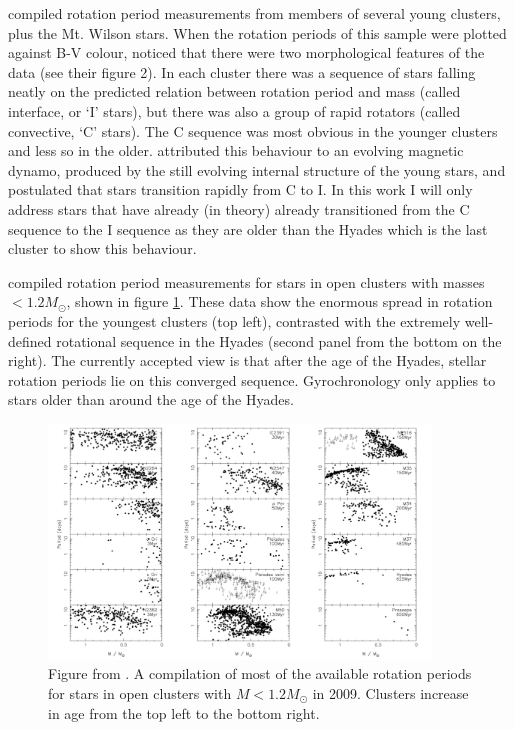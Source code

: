 \citet{Barnes2003} compiled rotation period measurements from members of
several young clusters, plus the Mt. Wilson stars.
When the rotation periods of this sample were plotted against B-V colour,
\citet{Barnes2003} noticed that there were two morphological features of the
data (see their figure 2).
In each cluster there was a sequence of stars falling neatly on the predicted
relation between rotation period and mass (called interface, or `I' stars),
but there was also a group of rapid rotators (called convective, `C' stars).
The C sequence was most obvious in the younger clusters and less so in the
older.
\citet{Barnes2003} attributed this behaviour to an evolving magnetic dynamo,
produced by the still evolving internal structure of the young stars, and
postulated that stars transition rapidly from C to I.
In this work I will only address stars that have already (in theory) already
transitioned from the C sequence to the I sequence as they are older than the
Hyades which is the last cluster to show this behaviour.

\citet{Irwin2009} compiled rotation period measurements for stars in open
clusters with masses $< 1.2 M_\odot$, shown in figure \ref{fig:irwin}.
These data show the enormous spread in rotation periods for the youngest
clusters (top left), contrasted with the extremely well-defined rotational
sequence in the Hyades (second panel from the bottom on the right).
The currently accepted view is that after the age of the Hyades, stellar
rotation periods lie on this converged sequence.
Gyrochronology only applies to stars older than around the age of the Hyades.
\begin{figure}[p]
\begin{center}
\includegraphics[width=4in, clip=true]{figures/irwin.pdf}
\caption[Cluster rotation from \citet{Irwin2009}]
{Figure from \citet{Irwin2009}. A compilation of most of the available
rotation periods for stars in open clusters with $M < 1.2 M_\odot$ in 2009.
Clusters increase in age from the top left to the bottom right.}
\label{fig:irwin}
\end{center}
\end{figure}


